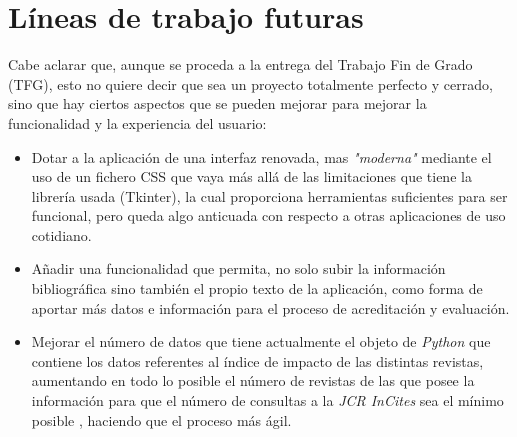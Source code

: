 \section{Líneas de trabajo futuras}
Cabe aclarar que, aunque se proceda a la entrega del Trabajo Fin de Grado (TFG), esto no quiere decir que sea un proyecto totalmente perfecto y cerrado, sino que hay ciertos aspectos que se pueden mejorar para mejorar la funcionalidad y la experiencia del usuario:
\begin{itemize}
	\item Dotar a la aplicación de una interfaz renovada, mas \emph{"moderna"} mediante el uso de un fichero CSS que vaya más allá de las limitaciones que tiene la librería usada (Tkinter), la cual proporciona herramientas suficientes para ser funcional, pero queda algo anticuada con respecto a otras aplicaciones de uso cotidiano.
	\item Añadir una funcionalidad que permita, no solo subir la información bibliográfica sino también el propio texto de la aplicación, como forma de aportar más datos e información para el proceso de acreditación y evaluación.
	\item Mejorar el número de datos que tiene actualmente el objeto de \emph{Python} que contiene los datos referentes al índice de impacto de las distintas revistas, aumentando en todo lo posible el número de revistas de las que posee la información para que el número de consultas a la \emph{JCR InCites} sea el mínimo posible , haciendo que el proceso más ágil.
\end{itemize} 